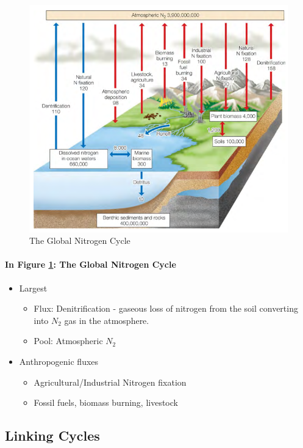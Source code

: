 \documentclass[12pt]{article}
\begin{document}
\begin{figure}[tph]
    \centering
    \includegraphics[width=5in]{global-nitrogen-cycle.png}
    \caption{The Global Nitrogen Cycle}
    \label{global-nitrogen}
\end{figure}

\paragraph{In Figure \ref{global-nitrogen}: The Global Nitrogen Cycle}
\begin{itemize}
    \item Largest
          \begin{itemize}
              \item Flux: Denitrification - gaseous loss of nitrogen from the soil converting into $N_2$ gas in the atmosphere.
              \item Pool: Atmospheric $N_2$
          \end{itemize}
    \item Anthropogenic fluxes
          \begin{itemize}
              \item Agricultural/Industrial Nitrogen fixation
              \item Fossil fuels, biomass burning, livestock
          \end{itemize}
\end{itemize}

\subsection{Linking Cycles}
\end{document}
